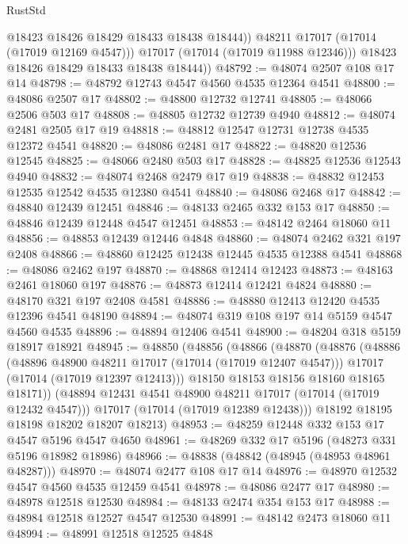 \begin{lexlean}{RustStd}
\begin{coremodule}
{\begin{coremodule}
{{{{{{{{{{{{{{{{{{{{{{{{{{{{{{{{{{{{{{{{{{{{{{{{{{{{{{{                @18423
                @18426
                @18429
                @18433
                @18438
                @18444))
            @48211
            @17017
            (@17014 (@17019 @12169 @4547)))
          @17017
          (@17014 (@17019 @11988 @12346)))
        @18423
        @18426
        @18429
        @18433
        @18438
        @18444))
@48792 := @48074 @2507 @108 @17 @14
@48798 := @48792 @12743 @4547 @4560 @4535 @12364 @4541
@48800 := @48086 @2507 @17
@48802 := @48800 @12732 @12741
@48805 := @48066 @2506 @503 @17
@48808 := @48805 @12732 @12739 @4940
@48812 := @48074 @2481 @2505 @17 @19
@48818 := @48812 @12547 @12731 @12738 @4535 @12372 @4541
@48820 := @48086 @2481 @17
@48822 := @48820 @12536 @12545
@48825 := @48066 @2480 @503 @17
@48828 := @48825 @12536 @12543 @4940
@48832 := @48074 @2468 @2479 @17 @19
@48838 := @48832 @12453 @12535 @12542 @4535 @12380 @4541
@48840 := @48086 @2468 @17
@48842 := @48840 @12439 @12451
@48846 := @48133 @2465 @332 @153 @17
@48850 := @48846 @12439 @12448 @4547 @12451
@48853 := @48142 @2464 @18060 @11
@48856 := @48853 @12439 @12446 @4848
@48860 := @48074 @2462 @321 @197 @2408
@48866 := @48860 @12425 @12438 @12445 @4535 @12388 @4541
@48868 := @48086 @2462 @197
@48870 := @48868 @12414 @12423
@48873 := @48163 @2461 @18060 @197
@48876 := @48873 @12414 @12421 @4824
@48880 := @48170 @321 @197 @2408 @4581
@48886 := @48880 @12413 @12420 @4535 @12396 @4541 @48190
@48894 := @48074 @319 @108 @197 @14 @5159 @4547 @4560 @4535
@48896 := @48894 @12406 @4541
@48900 := @48204 @318 @5159 @18917 @18921
@48945 := @48850
    (@48856
      (@48866
        (@48870
          (@48876
            (@48886
              (@48896 @48900 @48211 @17017 (@17014 (@17019 @12407 @4547)))
              @17017
              (@17014 (@17019 @12397 @12413)))
            @18150
            @18153
            @18156
            @18160
            @18165
            @18171))
        (@48894 @12431 @4541 @48900 @48211 @17017 (@17014 (@17019 @12432 @4547)))
        @17017
        (@17014 (@17019 @12389 @12438)))
      @18192
      @18195
      @18198
      @18202
      @18207
      @18213)
@48953 := @48259 @12448 @332 @153 @17 @4547 @5196 @4547 @4650
@48961 := @48269 @332 @17 @5196 (@48273 @331 @5196 @18982 @18986)
@48966 := @48838 (@48842 (@48945 (@48953 @48961 @48287)))
@48970 := @48074 @2477 @108 @17 @14
@48976 := @48970 @12532 @4547 @4560 @4535 @12459 @4541
@48978 := @48086 @2477 @17
@48980 := @48978 @12518 @12530
@48984 := @48133 @2474 @354 @153 @17
@48988 := @48984 @12518 @12527 @4547 @12530
@48991 := @48142 @2473 @18060 @11
@48994 := @48991 @12518 @12525 @4848
}}}}}}}}}}}}}}}}}}}}}}}}}}}}}}}}}}}}}}}}}}}}}}}}}}}}}}}
\end{coremodule}}
\end{coremodule}
\end{lexlean}
